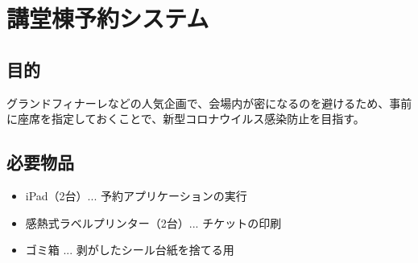 \documentclass[dvipdfmx,jb5]{jreport}
\begin{document}
\section{講堂棟予約システム}
\subsection{目的}
グランドフィナーレなどの人気企画で、会場内が密になるのを避けるため、事前に座席を指定しておくことで、新型コロナウイルス感染防止を目指す。
\subsection{必要物品}
\begin{itemize}
      \item iPad（2台）... 予約アプリケーションの実行
      \item 感熱式ラベルプリンター（2台）... チケットの印刷
      \item ゴミ箱 ... 剥がしたシール台紙を捨てる用
\end{itemize}
\end{document}
